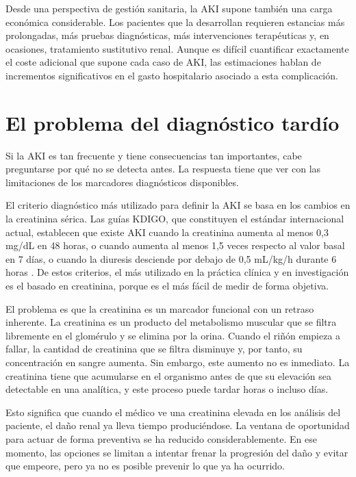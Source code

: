 \documentclass[12pt, a4paper, oneside]{report}
\begin{document}
Desde una perspectiva de gestión sanitaria, la AKI supone también una carga económica considerable. Los pacientes que la desarrollan requieren estancias más prolongadas, más pruebas diagnósticas, más intervenciones terapéuticas y, en ocasiones, tratamiento sustitutivo renal. Aunque es difícil cuantificar exactamente el coste adicional que supone cada caso de AKI, las estimaciones hablan de incrementos significativos en el gasto hospitalario asociado a esta complicación.

\section{El problema del diagnóstico tardío}

Si la AKI es tan frecuente y tiene consecuencias tan importantes, cabe preguntarse por qué no se detecta antes. La respuesta tiene que ver con las limitaciones de los marcadores diagnósticos disponibles.

El criterio diagnóstico más utilizado para definir la AKI se basa en los cambios en la creatinina sérica. Las guías KDIGO, que constituyen el estándar internacional actual, establecen que existe AKI cuando la creatinina aumenta al menos 0,3 mg/dL en 48 horas, o cuando aumenta al menos 1,5 veces respecto al valor basal en 7 días, o cuando la diuresis desciende por debajo de 0,5 mL/kg/h durante 6 horas \parencite{kdigo2012aki}. De estos criterios, el más utilizado en la práctica clínica y en investigación es el basado en creatinina, porque es el más fácil de medir de forma objetiva.

El problema es que la creatinina es un marcador funcional con un retraso inherente. La creatinina es un producto del metabolismo muscular que se filtra libremente en el glomérulo y se elimina por la orina. Cuando el riñón empieza a fallar, la cantidad de creatinina que se filtra disminuye y, por tanto, su concentración en sangre aumenta. Sin embargo, este aumento no es inmediato. La creatinina tiene que acumularse en el organismo antes de que su elevación sea detectable en una analítica, y este proceso puede tardar horas o incluso días.

Esto significa que cuando el médico ve una creatinina elevada en los análisis del paciente, el daño renal ya lleva tiempo produciéndose. La ventana de oportunidad para actuar de forma preventiva se ha reducido considerablemente. En ese momento, las opciones se limitan a intentar frenar la progresión del daño y evitar que empeore, pero ya no es posible prevenir lo que ya ha ocurrido.
\end{document}
